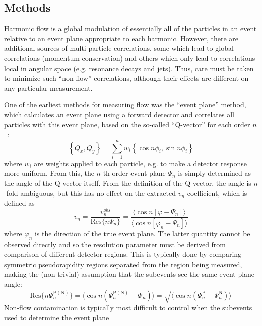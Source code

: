 \subsection{Methods}
\label{subsect:pas:flow:methods}
Harmonic flow is a global modulation of essentially all of the particles in an event relative to an event plane
appropriate to each harmonic.  However, there are additional sources of multi-particle correlations, some which
lead to global correlations (momentum conservation) and others which only lead to correlations local in angular space
(e.g. resonance decays and jets).  Thus, care must be taken to minimize such ``non flow'' correlations, although their effects are different
on any particular measurement.

One of the earliest methods for measuring flow was the ``event plane'' method, which calculates an event plane using
a forward detector and correlates all particles with this event plane, based on the so-called ``Q-vector'' for each order $n$~\cite{Poskanzer:1998yz}:
\begin{equation}
\left\{ Q_x, Q_y \right\} = \sum\limits_{i=1}^{n} w_i \left\{ \cos n \phi_i, \sin n \phi_i \right\}
\end{equation}
where $w_i$ are weights applied to each particle, e.g. to make a detector response more uniform.
From this, the $n$-th order event plane $\Psi_n$ is simply determined as the angle of the Q-vector itself.
From the definition of the Q-vector, the angle is $n$-fold ambiguous, but this has no effect on the extracted
$v_n$ coefficient, which is defined as
\begin{equation}
v_n = \frac{v^{obs}_n}{\mathrm{Res}\{ n \Psi_n \}} = \frac{ \langle \cos  n [\varphi - \Psi_n]  \rangle }{ \langle \cos  n [\varphi_n - \Psi_n]  \rangle    }
\end{equation}
where $\varphi_n$ is the direction of the true event plane.  The latter quantity cannot be observed directly and so the
resolution parameter must be derived from comparison of different detector regions.  This is typically done by comparing
symmetric pseudorapidity regions separated from the region being measured, making the
(non-trivial) assumption that the subevents see the same event plane angle:
\begin{equation}
\mathrm{Res} \{ n \Psi_n^{\mathrm{P(N)}} \} =
\langle \cos n ( \Psi_n^{\mathrm{P(N)}} - \Phi_n ) \rangle =
\sqrt{ \langle \cos n ( \Psi_n^{\mathrm{P}} - \Psi_n^{\mathrm{N}} ) \rangle }
\end{equation}
Non-flow contamination is typically most difficult to control when the subevents used to determine the event plane
